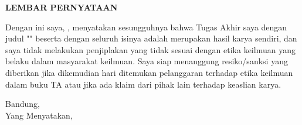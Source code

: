 \begin{center}

    \textbf{\LARGE LEMBAR PERNYATAAN}
    \end{center}
   { \large
    
    \vspace{1cm}
    \noindent Dengan ini saya, \Author, menyatakan sesungguhnya bahwa Tugas Akhir saya dengan judul "\textbf{\Title}" beserta dengan seluruh isinya adalah merupakan hasil karya sendiri, dan saya tidak melakukan penjiplakan yang tidak sesuai dengan etika keilmuan yang belaku dalam masyarakat keilmuan. Saya siap menanggung resiko/sanksi yang diberikan jika dikemudian hari ditemukan pelanggaran terhadap etika keilmuan dalam buku TA atau jika ada klaim dari pihak lain terhadap keaslian karya.\\
    \vspace{2cm}

\begin{flushright} 
Bandung, \Tanggal\quad \Bulan \quad \Tahun\\
Yang Menyatakan,


\vspace{1cm}
\Author
\newpage
\tableofcontents
\end{flushright} }
